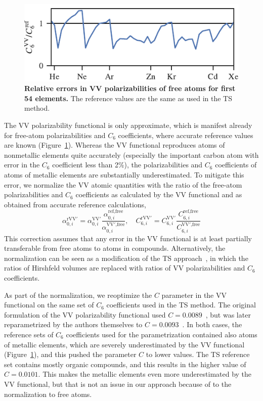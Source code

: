\begin{figure}[t!]
\centering
\includegraphics{../media/vv-periodic-table.pdf}
\caption{\textbf{Relative errors in VV polarizabilities of free atoms for first 54 elements.}
The reference values are the same as used in the TS method.
}\label{fig:vv-periodic-table}
\end{figure}

The VV polarizability functional is only approximate, which is manifest already for free-atom polarizabilities and $C_6$ coefficients, where accurate reference values are known (Figure~\ref{fig:vv-periodic-table}).
Whereas the VV functional reproduces atoms of nonmetallic elements quite accurately (especially the important carbon atom with error in the $C_6$ coefficient less than 2\%), the polarizabilities and $C_6$ coefficients of atoms of metallic elements are substantially underestimated.
To mitigate this error, we normalize the VV atomic quantities with the ratio of the free-atom polarizabilities and $C_6$ coefficients as calculated by the VV functional and as obtained from accurate reference calculations,
\begin{equation}
  \alpha_{0,i}^\text{rVV$'$}=\alpha_{0,i}^\mathrm{VV'}\frac{\alpha_{0,i}^\text{ref,free}}{\alpha_{0,i}^\text{VV$'$,free}},\quad
  C_{6,i}^\text{rVV$'$}=C_{6,i}^\mathrm{VV'}\frac{C_{6,i}^\text{ref,free}}{C_{6,i}^\text{VV$'$,free}}
\end{equation}
This correction assumes that any error in the VV functional is at least partially transferable from free atoms to atoms in compounds.
Alternatively, the normalization can be seen as a modification of the TS approach~\citep{TkatchenkoPRL09}, in which the ratios of Hirshfeld volumes are replaced with ratios of VV polarizabilities and $C_6$ coefficients.

As part of the normalization, we reoptimize the $C$ parameter in the VV functional on the same set of $C_6$ coefficients used in the TS method.
The original formulation of the VV polarizability functional used $C=0.0089$~\citep{VydrovPRL09}, but was later reparametrized by the authors themselves to $C=0.0093$~\citep{VydrovJCP10a}.
In both cases, the reference sets of $C_6$ coefficients used for the parametrization contained also atoms of metallic elements, which are severely underestimated by the VV functional (Figure~\ref{fig:vv-periodic-table}), and this pushed the parameter $C$ to lower values.
The TS reference set contains mostly organic compounds, and this results in the higher value of $C=0.0101$.
This makes the metallic elements even more underestimated by the VV functional, but that is not an issue in our approach because of to the normalization to free atoms.

